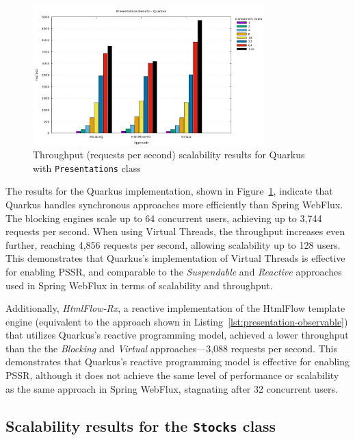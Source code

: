 \begin{figure}[h]
     \centering
     \includegraphics[width=0.8\textwidth]{./Graphs/presentations-quarkus-jmeter.png}
     \caption{Throughput (requests per second) scalability results for Quarkus with \texttt{Presentations} class}\label{fig:presentations-quarkus-jmeter}
\end{figure}

The results for the Quarkus implementation, shown in
Figure~\ref{fig:presentations-quarkus-jmeter}, indicate that Quarkus handles
synchronous approaches more efficiently than Spring WebFlux. The blocking
engines scale up to 64 concurrent users, achieving up to 3,744 requests per
second. When using Virtual Threads, the throughput increases even further,
reaching 4,856 requests per second, allowing scalability up to 128 users. This
demonstrates that Quarkus's implementation of Virtual Threads is effective for
enabling PSSR\@, and comparable to the \textit{Suspendable} and
\textit{Reactive} approaches used in Spring WebFlux in terms of scalability and
throughput.

Additionally, \textit{HtmlFlow-Rx}, a reactive implementation of the HtmlFlow
template engine (equivalent to the approach shown in
Listing~\ref{lst:presentation-observable}) that utilizes Quarkus's reactive
programming model, achieved a lower throughput than the the \textit{Blocking}
and \textit{Virtual} approaches—3,088 requests per second. This demonstrates
that Quarkus's reactive programming model is effective for enabling PSSR\@,
although it does not achieve the same level of performance or scalability as
the same approach in Spring WebFlux, stagnating after 32 concurrent users.

\subsection{Scalability results for the \texttt{Stocks} class} \label{sec:stocks-results}

